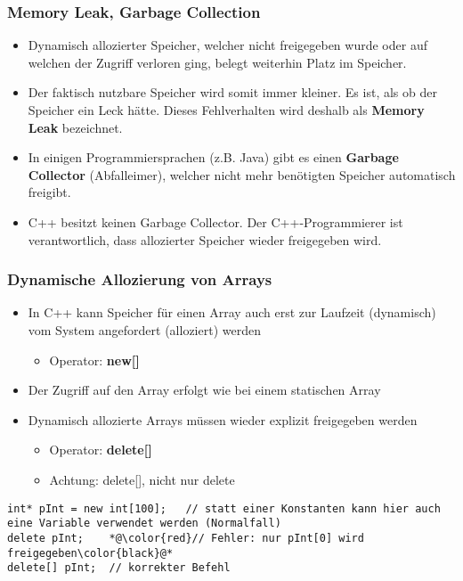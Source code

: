 \subsubsection{Memory Leak, Garbage Collection\hfill}
\label{sec:unterunterabschnitt}
\begin{itemize}
	\item Dynamisch allozierter Speicher, welcher nicht freigegeben wurde oder auf welchen der Zugriff verloren ging, belegt weiterhin Platz im Speicher.
	\item Der faktisch nutzbare Speicher wird somit immer kleiner. Es ist, als ob der Speicher ein Leck hätte. Dieses Fehlverhalten wird deshalb als \textbf{Memory Leak} bezeichnet.
	\item In einigen Programmiersprachen (z.B. Java) gibt es einen \textbf{Garbage Collector} (Abfalleimer), welcher nicht mehr benötigten Speicher automatisch freigibt.
	\item C++ besitzt keinen Garbage Collector. Der C++-Programmierer ist verantwortlich, dass allozierter Speicher wieder freigegeben wird.
\end{itemize}

\subsubsection{Dynamische Allozierung von Arrays\hfill}
\label{sec:unterunterabschnitt}
\begin{itemize}
	\item In C++ kann Speicher für einen Array auch erst zur Laufzeit (dynamisch) vom System angefordert (alloziert) werden
	\begin{itemize}
		\item Operator: \textbf{new[]}
	\end{itemize}
	\item Der Zugriff auf den Array erfolgt wie bei einem statischen Array
	\item Dynamisch allozierte Arrays müssen wieder explizit freigegeben werden
	\begin{itemize}
		\item Operator: \textbf{delete[]}
		\item \color{red}Achtung: delete[], nicht nur delete\color{black}
	\end{itemize}
\end{itemize}


\noindent
\begin{minipage}{\linewidth}
\begin{lstlisting}
int* pInt = new int[100];	// statt einer Konstanten kann hier auch eine Variable verwendet werden (Normalfall)
delete pInt;	*@\color{red}// Fehler: nur pInt[0] wird freigegeben\color{black}@*
delete[] pInt;	// korrekter Befehl
\end{lstlisting}
\end{minipage} 

